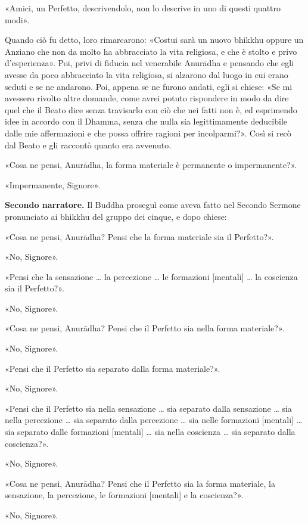 «Amici, un Perfetto, descrivendolo, non lo descrive in uno di questi
quattro modi».


Quando ciò fu detto, loro rimarcarono: «Costui sarà un nuovo bhikkhu
oppure un Anziano che non da molto ha abbracciato la vita religiosa, e
che è stolto e privo d’esperienza». Poi, privi di fiducia nel venerabile
Anurādha e pensando che egli avesse da poco abbracciato la vita
religiosa, si alzarono dal luogo in cui erano seduti e se ne andarono.
Poi, appena se ne furono andati, egli si chiese: «Se mi avessero rivolto
altre domande, come avrei potuto rispondere in modo da dire quel che il
Beato dice senza travisarlo con ciò che nei fatti non è, ed esprimendo
idee in accordo con il Dhamma, senza che nulla sia legittimamente
deducibile dalle mie affermazioni e che possa offrire ragioni per
incolparmi?». Così si recò dal Beato e gli raccontò quanto era avvenuto.


«Cosa ne pensi, Anurādha, la forma materiale è permanente o
impermanente?».


«Impermanente, Signore».


\textbf{Secondo narratore.} Il Buddha proseguì come aveva fatto nel Secondo
Sermone pronunciato ai bhikkhu del gruppo dei cinque, e dopo chiese:


«Cosa ne pensi, Anurādha? Pensi che la forma materiale sia il
Perfetto?».


«No, Signore».


«Pensi che la sensazione … la percezione … le formazioni [mentali] … la
coscienza sia il Perfetto?».


«No, Signore».


«Cosa ne pensi, Anurādha? Pensi che il Perfetto sia nella forma
materiale?».


«No, Signore».


«Pensi che il Perfetto sia separato dalla forma materiale?».


«No, Signore».


«Pensi che il Perfetto sia nella sensazione … sia separato dalla sensazione …
sia nella percezione … sia separato dalla percezione … sia nelle formazioni
[mentali] … sia separato dalle formazioni [mentali] … sia nella coscienza
… sia separato dalla coscienza?».


«No, Signore».


«Cosa ne pensi, Anurādha? Pensi che il Perfetto sia la forma materiale,
la sensazione, la percezione, le formazioni [mentali] e la coscienza?».


«No, Signore».


